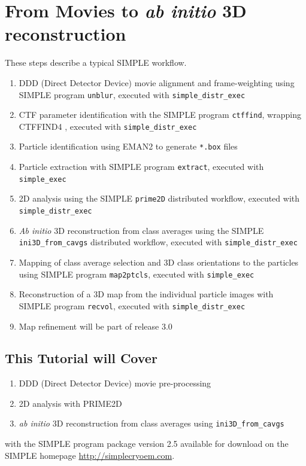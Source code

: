 \documentclass[a4paper,11pt]{article}
\newcommand{\prgname}[1]{\textcolor{NavyBlue}{\texttt{#1}}}
\begin{document}
\section{From Movies to \textit{ab initio} 3D reconstruction}
These steps describe a typical SIMPLE workflow.
\begin{enumerate}
\item DDD (Direct Detector Device) movie alignment and frame-weighting using SIMPLE program \prgname{unblur}, executed with \texttt{simple\_distr\_exec}
\item CTF parameter identification with the SIMPLE program \prgname{ctffind}, wrapping CTFFIND4 \citep{rohou2015ctffind4}, executed with \texttt{simple\_distr\_exec}
\item Particle identification using EMAN2 \citep{Tang:2007aa} to generate \texttt{*.box} files
\item Particle extraction with SIMPLE program \prgname{extract}, executed with \texttt{simple\_exec}
\item 2D analysis using the SIMPLE \prgname{prime2D} distributed workflow, executed with \texttt{simple\_distr\_exec}
\item \textit{Ab initio} 3D reconstruction from class averages using the SIMPLE \prgname{ini3D\_from\_cavgs} distributed workflow, executed with \texttt{simple\_distr\_exec}
\item Mapping of class average selection and 3D class orientations to the particles using SIMPLE program \prgname{map2ptcls}, executed with \texttt{simple\_exec}
\item Reconstruction of a 3D map from the individual particle images with SIMPLE program \prgname{recvol}, executed with \texttt{simple\_distr\_exec}
\item Map refinement will be part of release 3.0
\end{enumerate}

\subsection{This Tutorial will Cover}
\begin{enumerate}
\item DDD (Direct Detector Device) movie pre-processing
\item 2D analysis with PRIME2D
\item \textit{ab initio} 3D reconstruction from class averages using \prgname{ini3D\_from\_cavgs} 
\end{enumerate}
with the SIMPLE program package version 2.5 available for download on the SIMPLE homepage \url{http://simplecryoem.com}.
\end{document}
